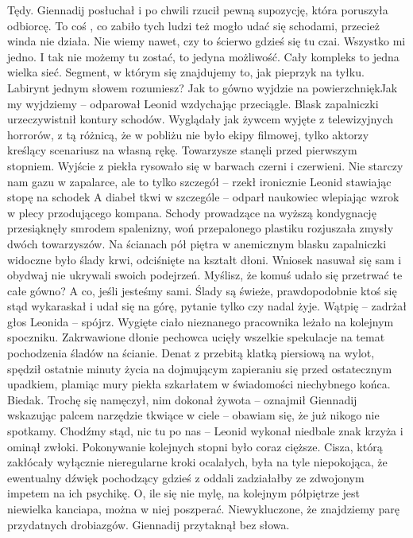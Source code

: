 \documentclass[../MAIN.tex]{subfiles}
\begin{document}
\sx Tędy.\qd 
Giennadij posłuchał i po chwili rzucił pewną supozycję, która poruszyła odbiorcę. 
\sx To coś , co zabiło tych ludzi też mogło udać się schodami, przecież winda nie działa. Nie wiemy nawet, czy to ścierwo gdzieś się tu czai. 
\xx Wszystko mi jedno. I tak nie możemy tu zostać, to jedyna możliwość. Cały kompleks to jedna wielka sieć. Segment, w którym się znajdujemy to, jak pieprzyk na tyłku. Labirynt jednym słowem rozumiesz? Jak to gówno wyjdzie na powierzchnię\3kJak my wyjdziemy -- odparował Leonid wzdychając przeciągle. 
\qd
Blask zapalniczki urzeczywistnił kontury schodów. Wyglądały jak żywcem wyjęte z telewizyjnych horrorów, z tą różnicą, że w pobliżu nie było ekipy filmowej, tylko aktorzy kreślący scenariusz na własną rękę. Towarzysze stanęli przed pierwszym stopniem. Wyjście z piekła rysowało się w barwach czerni i czerwieni. 
\sx Nie starczy nam gazu w zapalarce, ale to tylko szczegół -- rzekł ironicznie Leonid stawiając stopę na schodek 
\xx A diabeł tkwi w szczególe -- odparł naukowiec wlepiając wzrok w plecy przodującego kompana.
\qd
% 
% 
Schody prowadzące na wyższą kondygnację przesiąknęły smrodem spalenizny, woń przepalonego plastiku rozjuszała zmysły dwóch towarzyszów. Na ścianach pół piętra w anemicznym blasku zapalniczki widoczne było ślady krwi, odciśnięte na kształt dłoni. Wniosek nasuwał się sam i obydwaj nie ukrywali swoich podejrzeń. 
\sx Myślisz, że komuś udało się przetrwać te całe gówno? A co, jeśli jesteśmy sami. 
\xx Ślady są świeże, prawdopodobnie ktoś się stąd wykaraskał i udał się na górę, pytanie tylko czy nadal żyje. 
\xx Wątpię -- zadrżał głos Leonida -- spójrz. 
\qd
Wygięte ciało nieznanego pracownika leżało na kolejnym spoczniku. Zakrwawione dłonie pechowca ucięły wszelkie spekulacje na temat pochodzenia śladów na ścianie. Denat z przebitą klatką piersiową na wylot, spędził ostatnie minuty życia na dojmującym zapieraniu się przed ostatecznym upadkiem, plamiąc mury piekła szkarłatem w świadomości niechybnego końca. 
\sx Biedak. Trochę się namęczył, nim dokonał żywota -- oznajmił Giennadij wskazując palcem narzędzie tkwiące w ciele -- obawiam się, że już nikogo nie spotkamy. 
\xx Chodźmy stąd, nic tu po nas -- Leonid wykonał niedbale znak krzyża i ominął zwłoki. 
Pokonywanie kolejnych stopni było coraz cięższe. Cisza, którą zakłócały wyłącznie nieregularne kroki ocalałych, była na tyle niepokojąca, że ewentualny dźwięk pochodzący gdzieś z oddali zadziałałby ze zdwojonym impetem na ich psychikę. 
\xx O, ile się nie mylę, na kolejnym półpiętrze jest niewielka kanciapa, można w niej poszperać. Niewykluczone, że znajdziemy parę przydatnych drobiazgów. 
\qd
Giennadij przytaknął bez słowa. 
\end{document}
